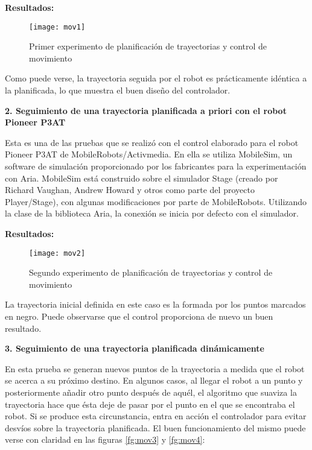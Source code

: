 \textbf{Resultados:}
\begin{figure}[h]
  \centering\texttt{[image: mov1]}\\
  \caption{Primer experimento de planificación de trayectorias y control de movimiento}\label{fg:mov1}
\end{figure}

Como puede verse, la trayectoria seguida por el robot es prácticamente idéntica a la planificada, lo que muestra el buen diseño del controlador.

\noindent
\textbf{\textbf{2.} Seguimiento de una trayectoria planificada a priori con el robot Pioneer P3AT}

Esta es una de las pruebas que se realizó con el control elaborado para el robot Pioneer P3AT de MobileRobots/Activmedia. En ella se utiliza MobileSim, un software de simulación proporcionado por los fabricantes para la experimentación con Aria. MobileSim está construido sobre el simulador Stage (creado por Richard Vaughan, Andrew Howard y otros como parte del proyecto Player/Stage), con algunas modificaciones por parte de MobileRobots. Utilizando la clase  de la biblioteca Aria, la conexión se inicia por defecto con el simulador.


\textbf{Resultados:}
\begin{figure}[h]
  \centering\texttt{[image: mov2]}\\
  \caption{Segundo experimento de planificación de trayectorias y control de movimiento}\label{fg:mov2}
\end{figure}

La trayectoria inicial definida en este caso es la formada por los puntos marcados en negro. Puede observarse que el control proporciona de nuevo un buen resultado.

\noindent
\textbf{\textbf{3.} Seguimiento de una trayectoria planificada dinámicamente}

En esta prueba se generan nuevos puntos de la trayectoria a medida que el robot se acerca a su próximo destino. En algunos casos, al llegar el robot a un punto y posteriormente añadir otro punto después de aquél, el algoritmo que suaviza la trayectoria hace que ésta deje de pasar por el punto en el que se encontraba el robot. Si se produce esta circunstancia, entra en acción el controlador para evitar desvíos sobre la trayectoria planificada. El buen funcionamiento del mismo puede verse con claridad en las figuras \ref{fg:mov3} y \ref{fg:mov4}:



